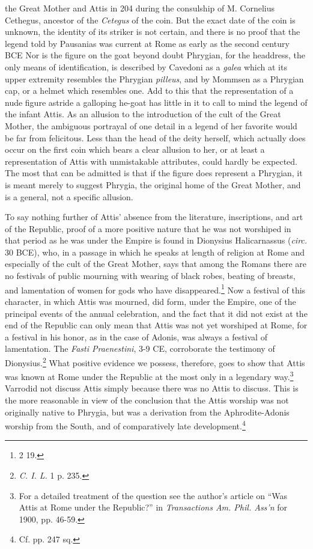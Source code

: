 \documentclass[a4paper, 11pt, oneside, polutonikogreek, english]{article}
\begin{document}
the Great Mother and Attis in 204 during the consulship of M. Cornelius Cethegus, ancestor of the \emph{Cetegus} of the coin. But the exact date of the coin is unknown, the identity of its striker is not certain, and there is no proof that the legend told by Pausanias was current at Rome as early as the second century \textsc{BCE} Nor is the figure on the goat beyond doubt Phrygian, for the headdress, the only means of identification, is described by Cavedoni as a \emph{galea} which at its upper extremity resembles the Phrygian \emph{pilleus}, and by Mommsen as a Phrygian cap, or a helmet which resembles one. Add to this that the representation of a nude figure astride a galloping he-goat has little in it to call to mind the legend of the infant Attis. As an allusion to the introduction of the cult of the Great Mother, the ambiguous portrayal of one detail in a legend of her favorite would be far from felicitous. Less than the head of the deity herself, which actually does occur on the first coin which bears a clear allusion to her, or at least a representation of Attis with unmistakable attributes, could hardly be expected. The most that can be admitted is that if the figure does represent a Phrygian, it is meant merely to suggest Phrygia, the original home of the Great Mother, and is a general, not a specific allusion.

To say nothing further of Attis' absence from the literature, inscriptions, and art of the Republic, proof of a more positive nature that he was not worshiped in that period as he was under the Empire is found in Dionysius Halicarnassus (\emph{circ.} 30 \textsc{BCE}), who, in a passage in which he speaks at length of religion at Rome and especially of the cult of the Great Mother, says that among the Romans there are no festivals of public mourning with wearing of black robes, beating of breasts, and lamentation of women for gods who have disappeared.\footnote{2 19.} Now a festival of this character, in which Attis was mourned, did form, under the Empire, one of the principal events of the annual celebration, and the fact that it did not exist at the end of the Republic can only mean that Attis was not yet worshiped at Rome, for a festival in his honor, as in the case of Adonis, was always a festival of lamentation. The \emph{Fasti Praenestini}, 3-9 \textsc{CE}, corroborate the testimony of Dionysius.\footnote{\emph{C. I. L.} 1 p. 235.} What positive evidence we possess, therefore, goes to show that Attis was known at Rome under the Republic at the most only in a legendary way.\footnote{For a detailed treatment of the question see the author's article on ``Was Attis at Rome under the Republic?'' in \emph{Transactions Am. Phil. Ass'n} for 1900, pp. 46-59.} Varrodid not discuss Attis simply because there was no Attis to discuss. This is the more reasonable in view of the conclusion that the Attis worship was not originally native to Phrygia, but was a derivation from the Aphrodite-Adonis worship from the South, and of comparatively late development.\footnote{Cf. pp. 247 sq.}
\end{document}
